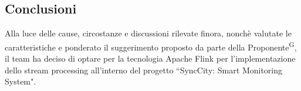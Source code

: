 \documentclass[8pt]{article}
\newcommand{\glossterm}[1]{#1\textsuperscript{G}} %
\begin{document}
\subsection{Conclusioni}
Alla luce delle cause, circostanze e discussioni rilevate finora, nonchè valutate le caratteristiche e ponderato il suggerimento proposto da parte della \glossterm{Proponente}, il team ha 
deciso di optare per la tecnologia Apache Flink per l'implementazione dello stream processing all'interno del progetto ``SyncCity: Smart Monitoring System".
\end{document}
